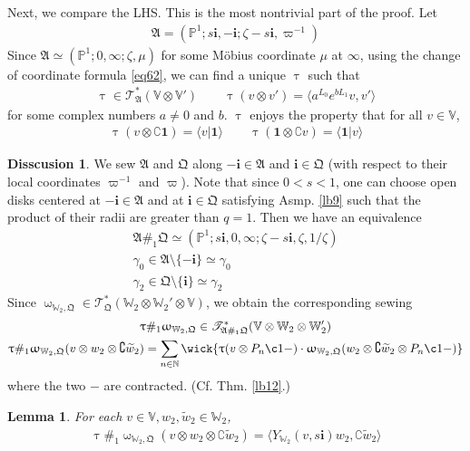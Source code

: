 \documentclass[11pt,b5paper,notitlepage]{article}
\theoremstyle{definition}
\newtheorem{diss}[df]{Disscusion}
\theoremstyle{plain}
\newtheorem{lm}[df]{Lemma}
\newcommand{\fk}{\mathfrak}
\newcommand{\wtd}{\widetilde}
\newcommand{\id}{\mathbf{1}}
\newcommand{\bk}[1]{\langle {#1}\rangle}
\newcommand{\scr}{\mathscr}
\newcommand{\im}{\mathbf{i}}
\newcommand{\Co}{\complement}
\newcommand{\Vbb}{\mathbb V}
\newcommand{\Wbb}{\mathbb W}
\newcommand{\Nbb}{\mathbb N}
\newcommand{\Pbb}{\mathbb P}
\numberwithin{equation}{section}
\begin{document}
Next, we compare the LHS. This is the most nontrivial part of the proof. Let
\begin{align*}
\fk A=(\Pbb^1;s\im,-\im;\zeta-s\im,\varpi^{-1})
\end{align*}
Since $\fk A\simeq(\Pbb^1;0,\infty;\zeta,\mu)$ for some M\"obius coordinate $\mu$ at $\infty$, using the change of coordinate formula \eqref{eq62}, we can find a unique $\uptau$ such that
\begin{gather*}
\uptau\in\scr T_{\fk A}^*(\Vbb\otimes\Vbb')\qquad \uptau(v\otimes v')=\bk{a^{L_0}e^{bL_1}v,v'}
\end{gather*}
for some complex numbers $a\neq 0$ and $b$. $\uptau$ enjoys the property that for all $v\in\Vbb$,
\begin{align}
\uptau(v\otimes\Co\id)=\bk{v|\id}\qquad\uptau(\id\otimes\Co v)=\bk{\id|v}  \label{eq82}
\end{align}


\begin{diss}\label{lb52}
We sew $\fk A$ and $\fk Q$ along $-\im\in\fk A$  and $\im\in\fk Q$  (with respect to their local coordinates $\varpi^{-1}$ and $\varpi$). Note that since $0<s<1$, one can choose open disks centered at $-\im\in\fk A$ and at $\im\in\fk Q$ satisfying Asmp. \ref{lb9} such that the product of their radii are greater than $q=1$. Then we have an equivalence
\begin{gather*}
\fk A\#_1\fk Q\simeq (\Pbb^1;s\im,0,\infty;\zeta-s\im,\zeta,1/\zeta)\\
\gamma_0\in \fk A\setminus\{-\im\}\simeq \gamma_0\\
\gamma_2\in  \fk Q\setminus\{\im\}\simeq  \gamma_2
\end{gather*}
Since $\upomega_{\Wbb_2,\fk Q}\in\scr T_{\fk Q}^*(\Wbb_2\otimes\Wbb_2'\otimes\Vbb)$, we obtain the corresponding sewing
\begin{gather*}
\uptau\#_1\upomega_{\Wbb_2,\fk Q}\in\scr T_{\fk A\#_1\fk Q}^*(\Vbb\otimes\Wbb_2\otimes\Wbb_2')\\
\uptau\#_1\upomega_{\Wbb_2,\fk Q}(v\otimes w_2\otimes\Co\wtd w_2)=\sum_{n\in\Nbb}\wick{\uptau(v\otimes P_n \c1-)\cdot \upomega_{\Wbb_2,\fk Q}(w_2\otimes\Co\wtd w_2\otimes P_n \c1 -) }
\end{gather*}
where the two $-$ are contracted. (Cf. Thm. \ref{lb12}.)
\end{diss}


\begin{lm}\label{lb55}
For each $v\in\Vbb,w_2,\wtd w_2\in\Wbb_2$,
\begin{align}
\uptau\#_1\upomega_{\Wbb_2,\fk Q}(v\otimes w_2\otimes\Co\wtd w_2)=\bk{Y_{\Wbb_2}(v,s\im)w_2,\Co\wtd w_2}  \label{eq81}
\end{align}
\end{lm}
\end{document}
